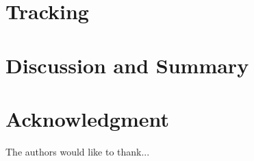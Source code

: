 \documentclass[journal]{IEEEtran}
\begin{document}
\section{Tracking}


\section{Discussion and Summary}


\section*{Acknowledgment}
The authors would like to thank...



\printbibliography
\end{document}
